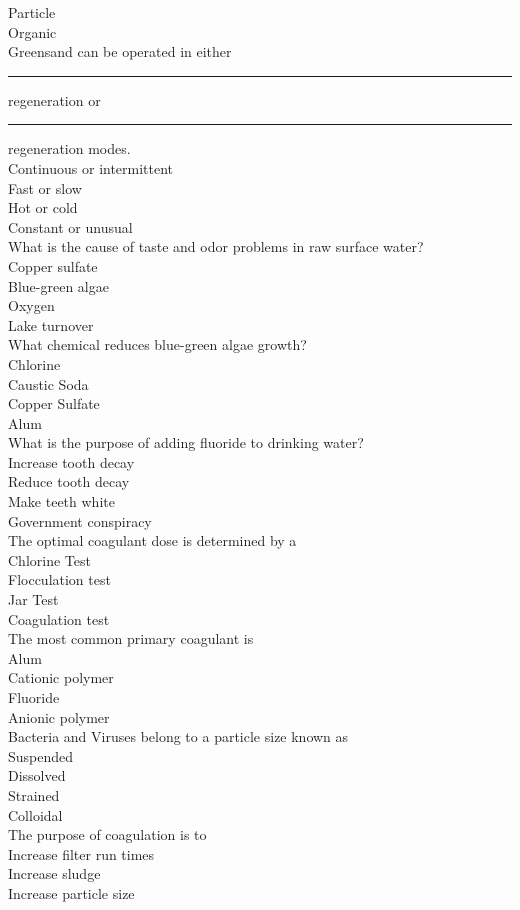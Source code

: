 Particle\\
Organic\\
Greensand can be operated in either \rule{1cm}{0.5pt}  regeneration or \rule{1cm}{0.5pt} regeneration modes.\\
Continuous or intermittent\\
Fast or slow\\
Hot or cold\\
Constant or unusual\\
 What is the cause of taste and odor problems in raw surface water?\\
Copper sulfate\\
Blue-green algae\\
Oxygen\\
Lake turnover\\
 What chemical reduces blue-green algae growth?\\
Chlorine\\
Caustic Soda\\
Copper Sulfate\\
Alum\\
What is the purpose of adding fluoride to drinking water?\\
Increase tooth decay\\
Reduce tooth decay\\
Make teeth white\\
Government conspiracy\\
The optimal coagulant dose is determined by a\\
Chlorine Test\\
Flocculation test\\
Jar Test\\
Coagulation test\\
 The most common primary coagulant is\\
Alum\\
Cationic polymer\\
Fluoride\\
Anionic polymer\\
 Bacteria and Viruses belong to a particle size known as\\
Suspended\\
Dissolved\\
Strained\\
Colloidal\\
 The purpose of coagulation is to\\
Increase filter run times\\
Increase sludge\\
Increase particle size\\
